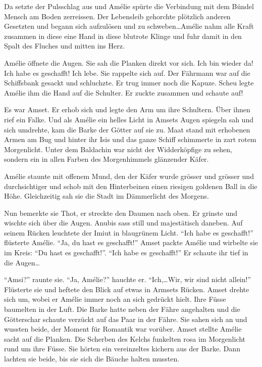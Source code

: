 \documentclass[11pt,titlepage,a5paper]{book}
\begin{document}
Da setzte der Pulsschlag aus und Amélie spürte die Verbindung mit dem Bündel Mensch am Boden zerreissen. Der Lebensleib gehorchte plötzlich anderen Gesetzten und begann sich aufzulösen und zu schweben\dots Amélie nahm alle Kraft zusammen in diese eine Hand in diese blutrote Klinge und fuhr damit in den Spalt des Fluches und mitten ins Herz.

Amélie öffnete die Augen. Sie sah die Planken direkt vor sich. Ich bin wieder da! Ich habe es geschafft! Ich lebe. Sie rappelte sich auf. Der Fährmann war auf die Schiffsbank gesackt und schluchzte. Er trug immer noch die Kapuze. Scheu legte Amélie ihm die Hand auf die Schulter. Er zuckte zusammen und schaute auf! 

Es war Amset. Er erhob sich und legte den Arm um ihre Schultern. Über ihnen rief ein Falke. Und als Amélie ein helles Licht in Amsets Augen spiegeln sah und sich umdrehte, kam die Barke der Götter auf sie zu. Maat stand mit erhobenen Armen am Bug und hinter ihr Isis und das ganze Schiff schimmerte in zart rotem Morgenlicht. Unter dem Baldachin war nicht der Widderköpfige zu sehen, sondern ein in allen Farben des Morgenhimmels glänzender Käfer.

Amélie staunte mit offenem Mund, den der Käfer wurde grösser und grösser und durchsichtiger und schob mit den Hinterbeinen einen riesigen goldenen Ball in die Höhe. Gleichzeitig sah sie die Stadt im Dämmerlicht des Morgens.

Nun bemerkte sie Thot, er streckte den Daumen nach oben. Er grinste und wischte sich über die Augen. Anubis sass still und majestätisch daneben. Auf seinem Rücken leuchtete der Imiut in blaugrünem Licht. "`Ich habe es geschafft!"' flüsterte Amélie. "`Ja, du hast es geschafft!"' Amset packte Amélie und wirbelte sie im Kreis: "`Du hast es geschafft!"'. "`Ich habe es geschafft!"' Er schaute ihr tief in die Augen\dots

"`Amsi?"' raunte sie. "`Ja, Amélie?"' hauchte er. "`Ich,\dots Wir, wir sind nicht allein!"' Flüsterte sie und heftete den Blick auf etwas in Armsets Rücken. Amset drehte sich um, wobei er Amélie immer noch an sich gedrückt hielt. Ihre Füsse baumelten in der Luft. Die Barke hatte neben der Fähre angehalten und die Götterschar schaute verzückt auf das Paar in der Fähre. Sie sahen sich an und wussten beide, der Moment für Romantik war vorüber. Amset stellte Amélie sacht auf die Planken. Die Scherben des Kelchs funkelten rosa im Morgenlicht rund um ihre Füsse. Sie hörten ein vereinzeltes kichern aus der Barke. Dann lachten sie beide, bis sie sich die Bäuche halten mussten. 
\end{document}
